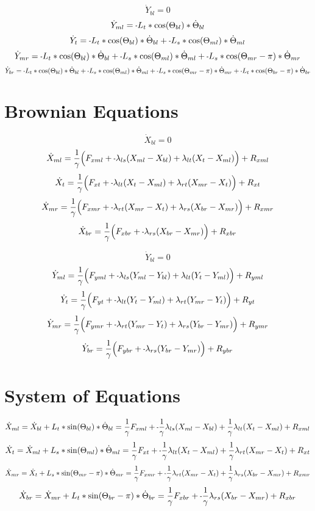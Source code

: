 \documentclass[11pt, landscape]{article}
\newcommand{\mn}{\scalebox{0.7}[1.0]{-}}
\begin{document}
$$\dot{Y}_{bl} = 0$$                                                               
$$\dot{Y}_{ml} = \mn L_{t}*\cos(\Theta_{bl}) * \dot{\Theta}_{bl}$$
$$\dot{Y}_{t}  = \mn L_{t}*\cos(\Theta_{bl}) * \dot{\Theta}_{bl} + \mn L_{s}*\cos(\Theta_{ml}) * \dot{\Theta}_{ml}$$
$$\dot{Y}_{mr} = \mn L_{t}*\cos(\Theta_{bl}) * \dot{\Theta}_{bl} + \mn L_{s}*\cos(\Theta_{ml}) * \dot{\Theta}_{ml} + \mn L_{s}*\cos(\Theta_{mr}-\pi) * \dot{\Theta}_{mr}$$
$$\dot{Y}_{br} = \mn L_{t}*\cos(\Theta_{bl}) * \dot{\Theta}_{bl} + \mn L_{s}*\cos(\Theta_{ml}) * \dot{\Theta}_{ml} + \mn L_{s}*\cos(\Theta_{mr}-\pi) * \dot{\Theta}_{mr} + \mn L_{t}*\cos(\Theta_{br}-\pi) * \dot{\Theta}_{br}$$

\section{Brownian Equations}
$$\dot{X}_{bl} = 0$$
$$\dot{X}_{ml} = \frac{1}{\gamma} \Big(F_{xml} + \mn \lambda_{ls}(X_{ml} - X_{bl}) + \lambda_{lt}(X_{t } - X_{ml}) \Big) + R_{xml}$$
$$\dot{X}_{t } = \frac{1}{\gamma} \Big(F_{xt } + \mn \lambda_{lt}(X_{t } - X_{ml}) + \lambda_{rt}(X_{mr} - X_{t }) \Big) + R_{xt }$$
$$\dot{X}_{mr} = \frac{1}{\gamma} \Big(F_{xmr} + \mn \lambda_{rt}(X_{mr} - X_{t }) + \lambda_{rs}(X_{br} - X_{mr}) \Big) + R_{xmr}$$
$$\dot{X}_{br} = \frac{1}{\gamma} \Big(F_{xbr} + \mn \lambda_{rs}(X_{br} - X_{mr})                                 \Big) + R_{xbr}$$

$$\dot{Y}_{bl} = 0$$
$$\dot{Y}_{ml} = \frac{1}{\gamma} \Big(F_{yml} + \mn \lambda_{ls}(Y_{ml} - Y_{bl}) + \lambda_{lt}(Y_{t } - Y_{ml}) \Big) + R_{yml}$$
$$\dot{Y}_{t}  = \frac{1}{\gamma} \Big(F_{yt } + \mn \lambda_{lt}(Y_{t } - Y_{ml}) + \lambda_{rt}(Y_{mr} - Y_{t }) \Big) + R_{yt }$$
$$\dot{Y}_{mr} = \frac{1}{\gamma} \Big(F_{ymr} + \mn \lambda_{rt}(Y_{mr} - Y_{t }) + \lambda_{rs}(Y_{br} - Y_{mr}) \Big) + R_{ymr}$$
$$\dot{Y}_{br} = \frac{1}{\gamma} \Big(F_{ybr} + \mn \lambda_{rs}(Y_{br} - Y_{mr})                                 \Big) + R_{ybr}$$

\section{System of Equations}

$$\dot{X}_{ml} = \dot{X}_{bl} + L_{t}*\sin(\Theta_{bl})     * \dot{\Theta}_{bl} = \frac{1}{\gamma}F_{xml} + \mn\frac{1}{\gamma}\lambda_{ls}(X_{ml} - X_{bl}) + \frac{1}{\gamma}\lambda_{lt}(X_{t } - X_{ml}) + R_{xml}$$
$$\dot{X}_{t} = \dot{X}_{ml} + L_{s}*\sin(\Theta_{ml})     * \dot{\Theta}_{ml} = \frac{1}{\gamma}F_{xt } + \mn\frac{1}{\gamma}\lambda_{lt}(X_{t } - X_{ml}) + \frac{1}{\gamma}\lambda_{rt}(X_{mr} - X_{t }) + R_{xt }$$
$$\dot{X}_{mr} = \dot{X}_{t } + L_{s}*\sin(\Theta_{mr}-\pi) * \dot{\Theta}_{mr} = \frac{1}{\gamma}F_{xmr} + \mn\frac{1}{\gamma}\lambda_{rt}(X_{mr} - X_{t }) + \frac{1}{\gamma}\lambda_{rs}(X_{br} - X_{mr}) + R_{xmr}$$
$$\dot{X}_{br} = \dot{X}_{mr} + L_{t}*\sin(\Theta_{br}-\pi) * \dot{\Theta}_{br} = \frac{1}{\gamma}F_{xbr} + \mn\frac{1}{\gamma}\lambda_{rs}(X_{br} - X_{mr}) + R_{xbr}$$
\end{document}
